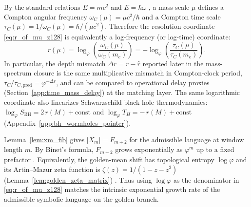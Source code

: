 \begin{remark}\label{rem:mass_as_compton_clock}
By the standard relations $E=mc^2$ and $E=\hbar\omega$ \cite{Einstein1905,NielsenChuang2010}, a mass scale $\mu$ defines a Compton angular frequency $\omega_C(\mu)=\mu c^2/\hbar$ and a Compton time scale $\tau_C(\mu)=1/\omega_C(\mu)=\hbar/(\mu c^2)$.
Therefore the resolution coordinate \eqref{eq:r_of_mu_z128} is equivalently a log-frequency (or log-time) coordinate:
\[
r(\mu)=\log_\varphi\!\left(\frac{\omega_C(\mu)}{\omega_C(m_e)}\right)
=-\log_\varphi\!\left(\frac{\tau_C(\mu)}{\tau_C(m_e)}\right).
\]
In particular, the depth mismatch $\Delta r=r-\widehat r$ reported later in the mass-spectrum closure is the same multiplicative mismatch in Compton-clock period, $\tau_C/\tau_{C,\mathrm{pred}}=\varphi^{-\Delta r}$, and can be compared to operational delay proxies (Section~\ref{app:time_mass_delay}) at the matching layer.
The same logarithmic coordinate also linearizes Schwarzschild black-hole thermodynamics: $\log_\varphi S_{\mathrm{BH}}=2\,r(M)+\text{const}$ and $\log_\varphi T_H=-\,r(M)+\text{const}$ (Appendix~\ref{app:bh_wormholes_pointer}).
\end{remark}

\begin{remark}\label{rem:phi_base_entropy}
Lemma~\ref{lem:xm_fib} gives $|X_m|=F_{m+2}$ for the admissible language at window length $m$.
By Binet's formula, $F_{m+2}$ grows exponentially as $\varphi^{m}$ up to a fixed prefactor \cite{HardyWright2008}.
Equivalently, the golden-mean shift has topological entropy $\log\varphi$ and its Artin--Mazur zeta function is $\zeta(z)=1/(1-z-z^2)$ (Lemma~\ref{lem:golden_zeta_matrix}) \cite{LindMarcus1995}.
Thus using $\log\varphi$ as the denominator in \eqref{eq:r_of_mu_z128} matches the intrinsic exponential growth rate of the admissible symbolic language on the golden branch.
\end{remark}


